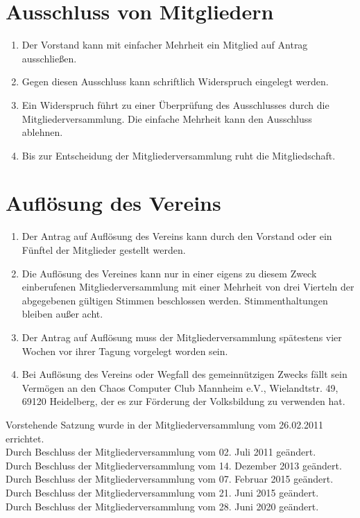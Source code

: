 \documentclass[a4paper, 12pt]{scrartcl}
\begin{document}
\section{Ausschluss von Mitgliedern}
\begin{enumerate}
	\item Der Vorstand kann mit einfacher Mehrheit ein Mitglied auf Antrag ausschließen.
	\item Gegen diesen Ausschluss kann schriftlich Widerspruch eingelegt werden.
	\item Ein Widerspruch führt zu einer Überprüfung des Ausschlusses durch die Mitgliederversammlung. Die einfache Mehrheit kann den Ausschluss ablehnen.
	\item Bis zur Entscheidung der Mitgliederversammlung ruht die Mitgliedschaft.
\end{enumerate}

\section{Auflösung des Vereins}
\begin{enumerate}
	\item Der Antrag auf Auflösung des Vereins kann durch den Vorstand oder ein Fünftel der Mitglieder gestellt werden.
	\item Die Auflösung des Vereines kann nur in einer eigens zu diesem Zweck einberufenen Mitgliederversammlung mit einer Mehrheit von drei Vierteln der abgegebenen gültigen Stimmen beschlossen werden. Stimmenthaltungen bleiben außer acht.
	\item Der Antrag auf Auflösung muss der Mitgliederversammlung spätestens vier
Wochen vor ihrer Tagung vorgelegt worden sein.
	\item Bei Auflösung des Vereins oder Wegfall des gemeinnützigen Zwecks fällt sein Vermögen an den Chaos Computer Club Mannheim e.V., Wielandtstr. 49, 69120 Heidelberg,
	der es zur Förderung der Volksbildung zu verwenden hat.
\end{enumerate}

\vspace{2.5cm}

\noindent Vorstehende Satzung wurde in der Mitgliederversammlung vom 26.02.2011 errichtet. \\[0.5em]
Durch Beschluss der Mitgliederversammlung vom 02. Juli 2011 geändert.\\[0.5cm]
Durch Beschluss der Mitgliederversammlung vom 14. Dezember 2013 geändert.\\[0.5cm]
Durch Beschluss der Mitgliederversammlung vom 07. Februar 2015 geändert.\\[0.5cm]
Durch Beschluss der Mitgliederversammlung vom 21. Juni 2015 geändert.\\[0.5cm]
Durch Beschluss der Mitgliederversammlung vom 28. Juni 2020 geändert.\\[0.5cm]
\end{document}
